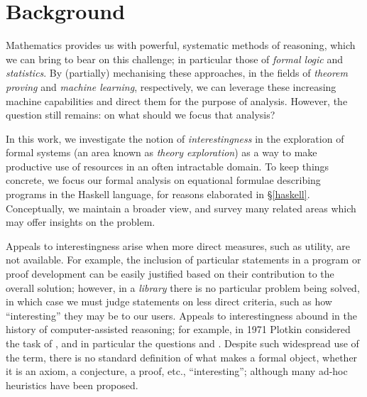 \section{Background}
\label{background}

\iffalse
TODO{2015-11-14}

Background

2.1 Introduce language signature
 b) stuff from QuickCheck/Spec

2.2? Machine learning and feature extraction
~1 page

2.3: QuickSpec, HipSpec
\fi

\iffalse

Mathematics provides us with powerful, systematic methods of reasoning, which we can bring to bear on this challenge; in particular those of \emph{formal logic} and \emph{statistics}. By (partially) mechanising these approaches, in the fields of \emph{theorem proving} and \emph{machine learning}, respectively, we can leverage these increasing machine capabilities and direct them for the purpose of analysis. However, the question still remains: on what should we focus that analysis?

In this work, we investigate the notion of \emph{interestingness} in the exploration of formal systems (an area known as \emph{theory exploration}) as a way to make productive use of resources in an often intractable domain. To keep things concrete, we focus our formal analysis on equational formulae describing programs in the Haskell language, for reasons elaborated in \S \ref{haskell}. Conceptually, we maintain a broader view, and survey many related areas which may offer insights on the problem.

Appeals to interestingness arise when more direct measures, such as utility, are not available. For example, the inclusion of particular statements in a program or proof development can be easily justified based on their contribution to the overall solution; however, in a \emph{library} there is no particular problem being solved, in which case we must judge statements on less direct criteria, such as how ``interesting'' they may be to our users. Appeals to interestingness abound in the history of computer-assisted reasoning; for example, in 1971 Plotkin \citep{plotkin1971further} considered the task of , and in particular the questions  and . Despite such widespread use of the term, there is no standard definition of what makes a formal object, whether it is an axiom, a conjecture, a proof, etc., ``interesting''; although many ad-hoc heuristics have been proposed.


